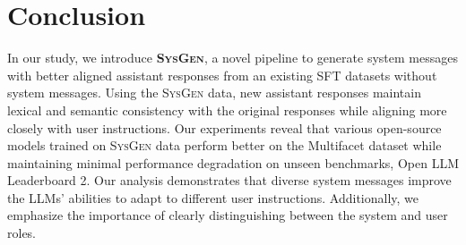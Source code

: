 \section{Conclusion}
In our study, we introduce \textbf{\textsc{SysGen}}, a novel pipeline to generate system messages with better aligned assistant responses from an existing SFT datasets without system messages.
Using the \textsc{SysGen} data, new assistant responses maintain lexical and semantic consistency with the original responses while aligning more closely with user instructions.
Our experiments reveal that various open-source models trained on \textsc{SysGen} data perform better on the Multifacet dataset while maintaining minimal performance degradation on unseen benchmarks, Open LLM Leaderboard 2.
Our analysis demonstrates that diverse system messages improve the LLMs' abilities to adapt to different user instructions.
Additionally, we emphasize the importance of clearly distinguishing between the system and user roles.
